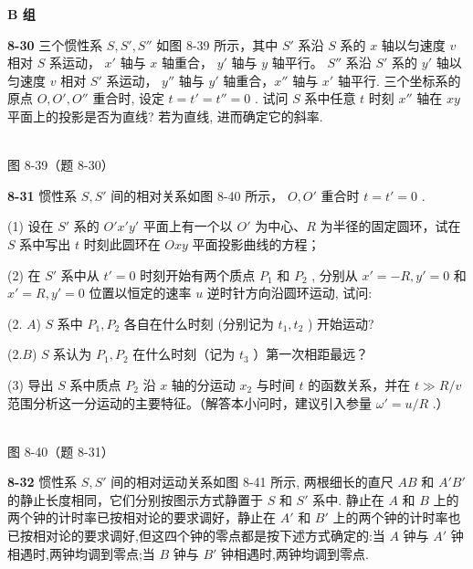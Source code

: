 \newpage

\begin{center}\textbf{B 组}\end{center}

\textbf{8-30} 三个惯性系 $S, S', S''$ 如图 8-39 所示，其中 $S'$ 系沿 $S$ 系的 $x$ 轴以匀速度 $v$ 相对 $S$ 系运动， $x'$ 轴与 $x$ 轴重合， $y'$ 轴与 $y$ 轴平行。 $S''$ 系沿 $S'$ 系的 $y'$ 轴以匀速度 $v$ 相对 $S'$ 系运动， $y''$ 轴与 $y'$ 轴重合，$x''$ 轴与 $x'$ 轴平行. 三个坐标系的原点 $O, O', O''$ 重合时, 设定 $t = t' = t'' = 0$ . 试问 $S$ 系中任意 $t$ 时刻 $x''$ 轴在 $xy$ 平面上的投影是否为直线? 若为直线, 进而确定它的斜率.

\begin{center}
\resizebox{0.50\textwidth}{!}{}\\[4pt]
{\small 图 8-39（题 8-30）}
\end{center}

\newpage

\textbf{8-31} 惯性系 $S,S'$ 间的相对关系如图 8-40 所示， $O, O'$ 重合时 $t = t' = 0$ .

(1) 设在 $S'$ 系的 $O'x'y'$ 平面上有一个以 $O'$ 为中心、$R$ 为半径的固定圆环，试在 $S$ 系中写出 $t$ 时刻此圆环在 $Oxy$ 平面投影曲线的方程；

(2) 在 $S'$ 系中从 $t' = 0$ 时刻开始有两个质点 $P_{1}$ 和 $P_{2}$ , 分别从 $x' = -R, y' = 0$ 和 $x' = R, y' = 0$ 位置以恒定的速率 $u$ 逆时针方向沿圆环运动, 试问:

(2. $A$) $S$ 系中 $P_{1}, P_{2}$ 各自在什么时刻 (分别记为 $t_{1}, t_{2}$ ) 开始运动?

(2.$B$) $S$ 系认为 $P_{1}, P_{2}$ 在什么时刻（记为 $t_{3}$ ）第一次相距最远？

(3) 导出 $S$ 系中质点 $P_{2}$ 沿 $x$ 轴的分运动 $x_{2}$ 与时间 $t$ 的函数关系，并在 $t \gg R / v$ 范围分析这一分运动的主要特征。（解答本小问时，建议引入参量 $\omega' = u / R$ .）

\begin{center}
\resizebox{0.50\textwidth}{!}{}\\[4pt]
{\small 图 8-40（题 8-31）}
\end{center}

\newpage

\textbf{8-32} 惯性系 $S,S'$ 间的相对运动关系如图 8-41 所示, 两根细长的直尺 $AB$ 和 $A'B'$ 的静止长度相同，它们分别按图示方式静置于 $S$ 和 $S'$ 系中. 静止在 $A$ 和 $B$ 上的两个钟的计时率已按相对论的要求调好，静止在 $A'$ 和 $B'$ 上的两个钟的计时率也已按相对论的要求调好,但这四个钟的零点都是按下述方式确定的:当 $A$ 钟与 $A'$ 钟相遇时,两钟均调到零点;当 $B$ 钟与 $B'$ 钟相遇时,两钟均调到零点.

